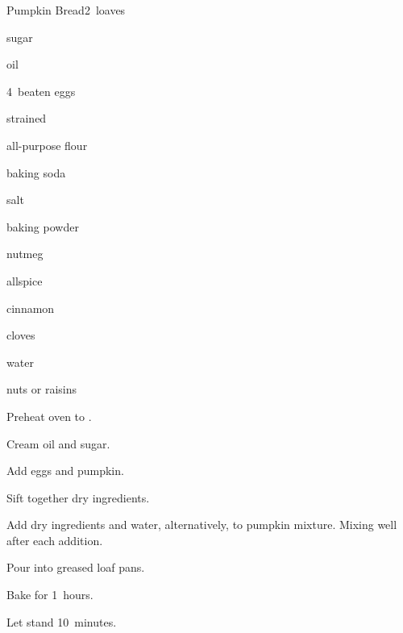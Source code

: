 \begin{recipe}{Pumpkin Bread}{}{2~loaves}

\begin{ingredients}
\item {} sugar
\item {} oil
\item 4~beaten eggs
\item {} strained 
\item \C{3\half} all-purpose flour
\item {} baking soda
\item {} salt
\item {} baking powder
\item {} nutmeg
\item {} allspice
\item {} cinnamon
\item \tp{\half} cloves
\item \C{\twothird} water
\item \C{\half} nuts or raisins
\end{ingredients}

\begin{directions}
\item Preheat oven to .
\item Cream oil and sugar.
\item Add eggs and pumpkin.
\item Sift together dry ingredients.
\item Add dry ingredients and water, alternatively, to pumpkin mixture. Mixing well after each addition.
\item Pour into greased loaf pans.
\item Bake for 1\half~hours.
\item Let stand 10~minutes.
\end{directions}

\end{recipe}
